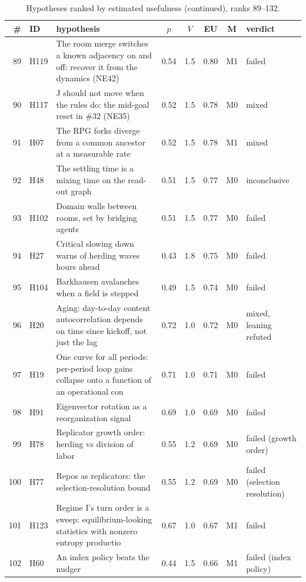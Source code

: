 \begin{table}[p]
\caption{Hypotheses ranked by estimated usefulness (continued), ranks 89--132.}

\scriptsize\renewcommand{\arraystretch}{0.95}
\begin{tabular}{@{}r l p{} c c c c l@{}}
\toprule \# & ID & hypothesis & $p$ & $V$ & EU & M & verdict\\ \midrule
89 & H119 & The room merge switches a known adjacency on and off: recover it from the dynamics (NE42) & 0.54 & 1.5 & 0.80 & M1 & failed\\
90 & H117 & J should not move when the rules do: the mid-goal reset in \#32 (NE35) & 0.52 & 1.5 & 0.78 & M0 & mixed\\
91 & H07 & The RPG forks diverge from a common ancestor at a measurable rate & 0.52 & 1.5 & 0.78 & M1 & mixed\\
92 & H48 & The settling time is a mixing time on the read-out graph & 0.51 & 1.5 & 0.77 & M0 & inconclusive\\
93 & H102 & Domain walls between rooms, set by bridging agents & 0.51 & 1.5 & 0.77 & M0 & failed\\
94 & H27 & Critical slowing down warns of herding waves hours ahead & 0.43 & 1.8 & 0.75 & M0 & failed\\
95 & H104 & Barkhausen avalanches when a field is stepped & 0.49 & 1.5 & 0.74 & M0 & failed\\
96 & H20 & Aging: day-to-day content autocorrelation depends on time since kickoff, not just the lag & 0.72 & 1.0 & 0.72 & M0 & mixed, leaning refuted\\
97 & H19 & One curve for all periods: per-period loop gains collapse onto a function of an operational con & 0.71 & 1.0 & 0.71 & M0 & failed\\
98 & H91 & Eigenvector rotation as a reorganization signal & 0.69 & 1.0 & 0.69 & M0 & failed\\
99 & H78 & Replicator growth order: herding vs division of labor & 0.55 & 1.2 & 0.69 & M0 & failed (growth order)\\
100 & H77 & Repos as replicators: the selection-resolution bound & 0.55 & 1.2 & 0.69 & M0 & failed (selection resolution)\\
101 & H123 & Regime I's turn order is a sweep: equilibrium-looking statistics with nonzero entropy productio & 0.67 & 1.0 & 0.67 & M1 & failed\\
102 & H60 & An index policy beats the nudger & 0.44 & 1.5 & 0.66 & M1 & failed (index policy)\\

\end{tabular}
\end{table}
